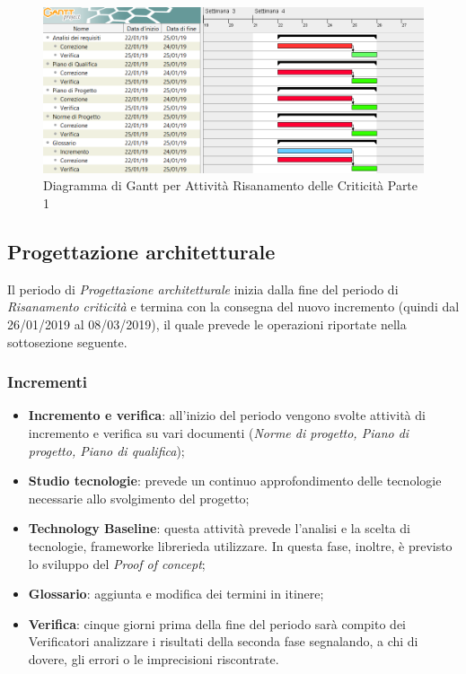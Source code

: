 \begin{figure}[h]
	\centering
  		\includegraphics[width=1.0\linewidth]{./images/RisanamentoCriticita1.png}
  		\caption{Diagramma di Gantt per Attività Risanamento delle Criticità Parte 1}
  		\label{fig:Gantt Risananmento Criticità 1}
\end{figure}

\newpage
\subsection{Progettazione architetturale}

Il periodo di \textit{Progettazione architetturale} inizia dalla fine del periodo di \textit{Risanamento criticità} e termina con la consegna del nuovo incremento (quindi dal 26/01/2019 al 08/03/2019), il quale prevede le operazioni riportate nella sottosezione seguente.

\subsubsection{Incrementi}
\begin{itemize}
	\item \textbf{Incremento e verifica}: all'inizio del periodo vengono svolte attività di incremento e verifica su vari documenti (\textit{Norme di progetto, Piano di progetto, Piano di qualifica});
	\item \textbf{Studio tecnologie}: prevede un continuo approfondimento delle tecnologie necessarie allo svolgimento del progetto; 
	\item \textbf{Technology Baseline}\glossario: questa attività prevede l'analisi e la scelta di tecnologie, framework\glossario e librerie\glossario da utilizzare. In questa fase, inoltre, è previsto lo sviluppo del \textit{Proof of concept}\glossario;
	\item \textbf{Glossario}: aggiunta e modifica dei termini in itinere;  
	\item \textbf{Verifica}: cinque giorni prima della fine del periodo sarà compito dei Verificatori analizzare i risultati della seconda fase segnalando, a chi di dovere, gli errori o le imprecisioni riscontrate.
\end{itemize}

